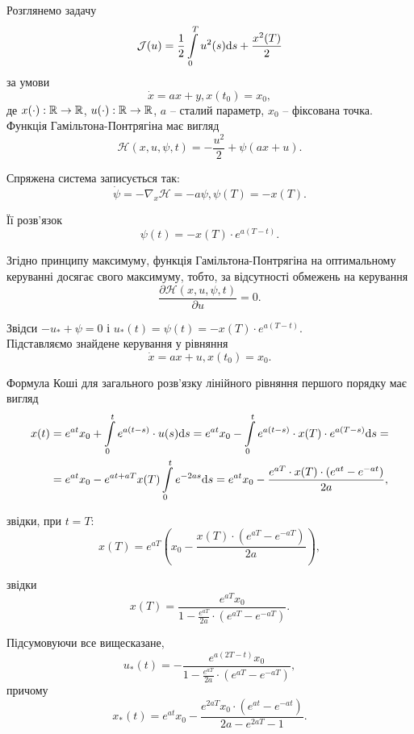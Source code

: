 \begin{example}
    Розглянемо задачу
    \[ \mathcal{J}(u) = \dfrac12 \displaystyle\int\limits_0^T u^2(s) \mathrm{d} s + \dfrac{x^2(T)}{2} \]
    за умови
    \[ \dot x = a x + y, x(t_0) = x_0, \]
    де $x(\cdot): \mathbb{R} \to \mathbb{R}$, $u(\cdot): \mathbb{R} \to \mathbb{R}$, $a$ -- сталий параметр, $x_0$ -- фіксована точка. \\
    
    Функція Гамільтона-Понтрягіна має вигляд
    \[ \mathcal{H}(x, u, \psi, t) = - \dfrac{u^2}{2} + \psi (a x + u). \]
    
    Спряжена система записується так:
    \[ \dot \psi = - \nabla_x \mathcal{H} = - a \psi, \psi(T) = - x(T). \]
    
    Її розв'язок 
    \[ \psi(t) = - x(T) \cdot e^{a (T - t)}. \]
    
    Згідно принципу максимуму, функція Гамільтона-Понтрягіна на оптимальному керуванні досягає свого максимуму, тобто, за відсутності обмежень на керування
    \[ \dfrac{\partial \mathcal{H}(x, u, \psi, t)}{\partial u} = 0.\]
    
    Звідси $- u_* + \psi = 0$ і $u_*(t) = \psi(t) = - x(T) \cdot e^{a (T - t)}$. \\
    
    Підставляємо знайдене керування у рівняння 
    \[ \dot x = a x + u, x(t_0) = x_0. \]
    
    Формула Коші для загального розв'язку лінійного рівняння першого порядку має вигляд
    \begin{equation*}
        \begin{aligned}
            x(t) &= e^{a t} x_0 + \displaystyle\int\limits_0^t e^{a (t - s)} \cdot u(s) \mathrm{d} s = e^{a t} x_0 - \displaystyle\int\limits_0^t  e^{a (t - s)} \cdot x(T) \cdot e^{a (T - s)} \mathrm{d} s = \\
            &= e^{a t} x_0 - e^{a t + a T} x(T) \displaystyle\int\limits_0^t  e^{- 2 a s} \mathrm{d} s = e^{a t} x_0 - \dfrac{e^{a T} \cdot x(T) \cdot \left(e ^{at} - e^{-a t}\right)}{2a},
        \end{aligned}
    \end{equation*}
    
    звідки, при $t = T$:
    \[ x(T) = e^{aT} \left( x_0 - \dfrac{x(T) \cdot \left( e^{aT} - e^{-aT} \right)}{2a} \right), \]
    
    звідки
    \[ x(T) = \dfrac{e^{a T} x_0}{1 - \frac{e^{aT}}{2a} \cdot \left(e^{aT} - e^{-aT}\right)}. \]
    
    
    Підсумовуючи все вищесказане,
    \[ u_*(t) = - \dfrac{e^{a (2T - t)} x_0}{1 - \frac{e^{aT}}{2a} \cdot \left(e^{aT} - e^{-aT} \right)}, \]
    причому 
    \[ x_*(t) = e^{at} x_0 - \dfrac{e^{2 a T} x_0 \cdot \left( e^{at} - e^{-at} \right)}{2a - e^{2aT} - 1}. \]
    
\end{example}

